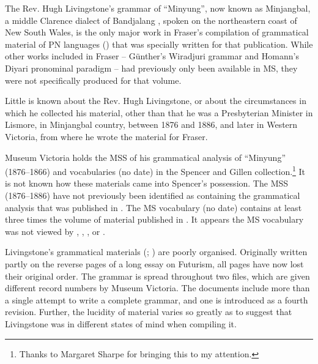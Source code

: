 The Rev. Hugh Livingstone’s grammar of ``Minyung'', now known as Minjangbal, a middle Clarence dialect of Bandjalang \citep[142]{crowley_middle_1978}, spoken on the northeastern coast of New South Wales, is the only major work in Fraser’s compilation of grammatical material of PN languages (\citeyear{fraser_australian_1892}) that was specially written for that publication. While other works included in Fraser – Günther’s Wiradjuri grammar and Homann’s Diyari pronominal paradigm – had previously only been available in MS, they were not specifically produced for that volume.

Little is known about the Rev. Hugh Livingstone, or about the circumstances in which he collected his material, other than that he was a Presbyterian Minister in Lismore, in Minjangbal country, between 1876 and 1886, and later in Western Victoria, from where he wrote the material for Fraser. 

Museum Victoria holds the MSS of his grammatical analysis of “Minyung” (1876--1866) and vocabularies (no date) in the Spencer and Gillen collection.\footnote{Thanks to Margaret Sharpe for bringing this to my attention.}  It is not known how these materials came into Spencer’s possession. The MSS (1876--1886) have not previously been identified as containing the grammatical analysis that was published in \citet{fraser_australian_1892}. The MS vocabulary (no date) contains at least three times the volume of material published in \citet{fraser_australian_1892}. It appears the MS vocabulary was not viewed by \citet{smythe1949}, \citet{cunningham1969}, \citet{geytenbeek1971}, or \citet{crowley_middle_1978}.

Livingstone’s grammatical materials (\citeyear{livingstone_notitle_1876}; \citeyear{livingstone_notitle_1876-1}) are poorly organised. Originally written partly on the reverse pages of a long essay on Futurism, all pages have now lost their original order. The grammar is spread throughout two files, which are given different record numbers by Museum Victoria. The documents include more than a single attempt to write a complete grammar, and one \citeyearpar{livingstone_notitle_1876} is introduced as a fourth revision. Further, the lucidity of material varies so greatly as to suggest that Livingstone was in different states of mind when compiling it. 

